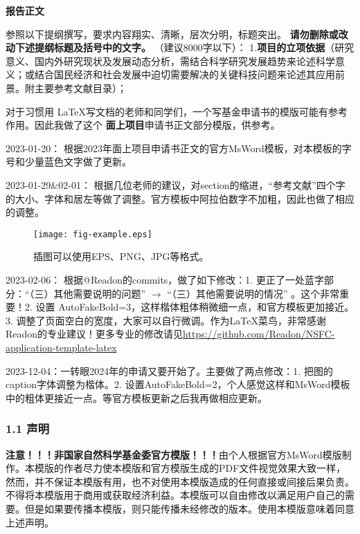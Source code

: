 \documentclass[12pt,UTF8,AutoFakeBold=2,a4paper]{ctexart} %
\newcommand{\sanhao}{\fontsize{16pt}{\baselineskip}\selectfont}
\newcommand{\sihao}{\fontsize{14pt}{\baselineskip}\selectfont}
\begin{document}
\begin{center}
{\sanhao \kaishu \bfseries 报告正文}
\end{center}

{\sihao \kaishu 参照以下提纲撰写，要求内容翔实、清晰，层次分明，标题突出。{\color{MsBlue} \bfseries 请勿删除或改动下述提纲标题及括号中的文字。}}
\vskip 2mm
{\sihao \color{MsBlue} （建议8000字以下）：}
\vskip 2mm
{\sihao \kaishu \color{MsBlue} 1.{\bfseries 项目的立项依据}（研究意义、国内外研究现状及发展动态分析，需结合科学研究发展趋势来论述科学意义；或结合国民经济和社会发展中迫切需要解决的关键科技问题来论述其应用前景。附主要参考文献目录）；}

对于习惯用 \LaTeX 写文档的老师和同学们，一个写基金申请书的模版可能有参考作用。因此我做了这个{\bfseries \color{Bittersweet} 面上项目}申请书正文部分模版，供参考。

2023-01-20： 根据2023年面上项目申请书正文的官方MsWord模板，对本模板的字号和少量蓝色文字做了更新。

2023-01-29\&02-01： 根据几位老师的建议，对section的缩进，“参考文献”四个字的大小、字体和居左等做了调整。官方模板中阿拉伯数字不加粗，因此也做了相应的调整。



\begin{figure}[!th]
\begin{center}
\texttt{[image: fig-example.eps]}
\caption{{\kaishu 插图可以使用EPS、PNG、JPG等格式。}}
\label{fig:example}
\end{center}
\end{figure}

2023-02-06： 根据@Readon的commits，做了如下修改：1. 更正了一处蓝字部分：``（三）其他需要说明的问题'' $\rightarrow$ ``（三）其他需要说明的情况'' 。这个非常重要！2. 设置 AutoFakeBold=3，这样楷体粗体稍微细一点，和官方模板更加接近。3. 调整了页面空白的宽度，大家可以自行微调。作为\LaTeX 菜鸟，非常感谢Readon的专业建议！更多专业的修改请见\url{https://github.com/Readon/NSFC-application-template-latex}

2023-12-04：一转眼2024年的申请又要开始了。主要做了两点修改：1. 把图的caption字体调整为楷体。2. 设置AutoFakeBold=2，个人感觉这样和MsWord模板中的粗体更接近一点。等官方模板更新之后我再做相应更新。



\vskip 2mm
\subsubsection{1.1 声明}
{\bfseries \color{red} 注意！！！非国家自然科学基金委官方模版！！！}由个人根据官方MsWord模版制作。本模版的作者尽力使本模版和官方模版生成的PDF文件视觉效果大致一样，然而，并不保证本模版有用，也不对使用本模版造成的任何直接或间接后果负责。 不得将本模版用于商用或获取经济利益。本模版可以自由修改以满足用户自己的需要。但是如果要传播本模版，则只能传播未经修改的版本。使用本模版意味着同意上述声明。
\end{document}
